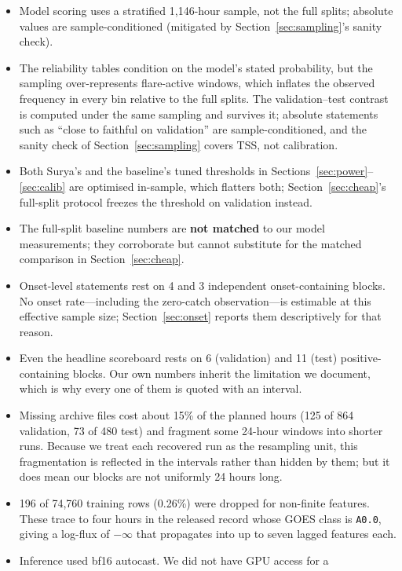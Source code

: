 \documentclass[11pt]{article}
\newcommand{\code}[1]{\texttt{#1}}
\begin{document}
\begin{itemize}
\item Model scoring uses a stratified 1{,}146-hour sample, not the full splits;
absolute values are sample-conditioned (mitigated by
Section~\ref{sec:sampling}'s sanity check).
\item The reliability tables condition on the model's stated probability, but
the sampling over-represents flare-active windows, which inflates the observed
frequency in every bin relative to the full splits. The validation--test
contrast is computed under the same sampling and survives it; absolute
statements such as ``close to faithful on validation'' are sample-conditioned,
and the sanity check of Section~\ref{sec:sampling} covers TSS, not calibration.
\item Both Surya's and the baseline's tuned thresholds in
Sections~\ref{sec:power}--\ref{sec:calib} are optimised in-sample, which flatters
both; Section~\ref{sec:cheap}'s full-split protocol freezes the threshold on
validation instead.
\item The full-split baseline numbers are \textbf{not matched} to our model
measurements; they corroborate but cannot substitute for the matched comparison
in Section~\ref{sec:cheap}.
\item Onset-level statements rest on 4 and 3 independent onset-containing blocks.
No onset rate---including the zero-catch observation---is estimable at this
effective sample size; Section~\ref{sec:onset} reports them descriptively for
that reason.
\item Even the headline scoreboard rests on 6 (validation) and 11 (test)
positive-containing blocks. Our own numbers inherit the limitation we document,
which is why every one of them is quoted with an interval.
\item Missing archive files cost about 15\% of the planned hours (125 of 864
validation, 73 of 480 test) and fragment some 24-hour windows into shorter runs.
Because we treat each recovered run as the resampling unit, this fragmentation is
reflected in the intervals rather than hidden by them; but it does mean our
blocks are not uniformly 24 hours long.
\item 196 of 74{,}760 training rows (0.26\%) were dropped for non-finite
features. These trace to four hours in the released record whose GOES class is
\code{A0.0}, giving a log-flux of $-\infty$ that propagates into up to seven
lagged features each.
\item Inference used bf16 autocast. We did not have GPU access for a

\end{itemize}
\end{document}
